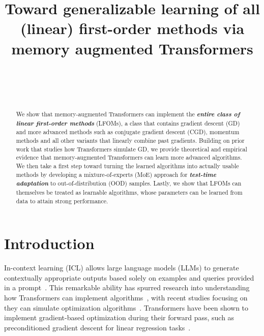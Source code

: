 \documentclass[11pt]{article}
\theoremstyle{plain}
\theoremstyle{definition}
\theoremstyle{remark}
\newcommand{\bemph}[1]{\textbf{\emph{#1}}}
\numberwithin{equation}{section}
\begin{document}
\title{Toward generalizable learning of all (linear) first-order methods via memory augmented Transformers}

\author{\\
\\
 \\
}

\maketitle

\begin{abstract}
We show that memory-augmented Transformers can implement the \bemph{entire class of linear first-order methods} (LFOMs), a class that contains gradient descent (GD) and more advanced methods such as conjugate gradient descent (CGD), momentum methods and all other variants that linearly combine past gradients. Building on prior work that studies how Transformers simulate GD, we provide theoretical and empirical evidence that memory-augmented Transformers can learn more advanced algorithms. We then take a first step toward turning the learned algorithms into actually usable methods by developing a mixture-of-experts (MoE) approach for \bemph{test-time adaptation} to out-of-distribution (OOD) samples. Lastly, we show that LFOMs can themselves be treated as learnable algorithms, whose parameters can be learned from data to attain strong performance.
\end{abstract}

\section{Introduction}
\label{Sect:Introduction}

In-context learning (ICL) allows large language models (LLMs) to generate contextually appropriate outputs based solely on examples and queries provided in a prompt~\citep{brown2020language, liu2021makes, lu2021fantastically, wei2022chain, wu2022self}. This remarkable ability has spurred research into understanding how Transformers can implement algorithms~\citep{achiam2023gpt, touvron2023llama}, with recent studies focusing on they can simulate optimization algorithms~\citep{dai2022can, von2023transformers, garg2022can, akyurek2022learning}. Transformers have been shown to implement gradient-based optimization during their forward pass, such as preconditioned gradient descent for linear regression tasks~\citep{dai2022can, mahankali2023one, ahn2024transformers}. 
\end{document}
